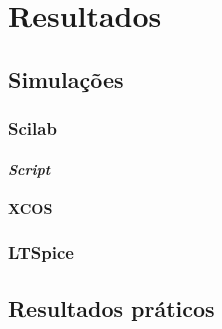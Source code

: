 \section{Resultados}

\lipsum[1]

\subsection{Simulações}
\lipsum[1]

\subsubsection{Scilab}
\lipsum[1]
\paragraph{\textit{Script}}
\lipsum[1]
\paragraph{XCOS}
\lipsum[1]

\subsubsection{LTSpice}
\lipsum[1]


\subsection{Resultados práticos}
\lipsum[1]

\pagebreak